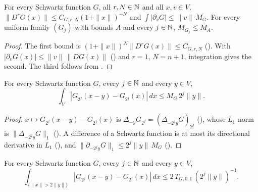 \begin{lemma}
\label{lem:gradient-mass}
\leanok
{}
For every Schwartz function $G$, all $r, N \in \mathbb{N}$ and all $x, v \in V$,
$\|D^r G(x)\| \leq C_{G,r,N} (1 + \|x\|)^{-N}$ and $\int |\partial_v G| \leq \|v\| \, M_G$. For
every uniform family $(G_j)$ with bounds $A$ and every $j \in \mathbb{N}$, $M_{G_j} \leq M_A$.
\end{lemma}

\begin{proof}
\leanok
The first bound is $(1 + \|x\|)^N \|D^r G(x)\| \leq C_{G,r,N}$ ().
With $|\partial_v G(x)| \leq \|v\| \, \|DG(x)\|$ () and $r = 1$,
$N = n + 1$, integration gives the second. The third follows from
.
\end{proof}

\begin{lemma}
\label{lem:hormander-short}
\leanok
{}
For every Schwartz function $G$, every $j \in \mathbb{N}$ and every $y \in V$,
\[
  \int_V |G_{2^j}(x - y) - G_{2^j}(x)| \, dx \leq M_G \, 2^j \|y\| .
\]
\end{lemma}

\begin{proof}
\leanok
$x \mapsto G_{2^j}(x - y) - G_{2^j}(x)$ is $\Delta_{-y} G_{2^j} = (\Delta_{-2^j y} G)_{2^j}$
(), whose $L_1$ norm is $\|\Delta_{-2^j y} G\|_1$
(). A difference of a Schwartz function is at most its directional
derivative in $L_1$ (), and
$\|\partial_{-2^j y} G\|_1 \leq 2^j \|y\| \, M_G$ ().
\end{proof}

\begin{lemma}
\label{lem:hormander-long}
\leanok
{}
For every Schwartz function $G$, every $j \in \mathbb{N}$ and every $y \in V$,
\[
  \int_{\{\|x\| > 2\|y\|\}} |G_{2^j}(x - y) - G_{2^j}(x)| \, dx \leq
  2 \, T_{G,0,1} \, (2^j \|y\|)^{-1} .
\]
\end{lemma}

